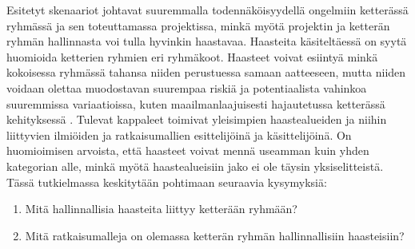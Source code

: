 Esitetyt skenaariot johtavat suuremmalla todennäköisyydellä ongelmiin ketterässä ryhmässä ja sen toteuttamassa projektissa, minkä myötä projektin ja ketterän ryhmän hallinnasta voi tulla hyvinkin haastavaa. Haasteita käsiteltäessä on syytä huomioida ketterien ryhmien eri ryhmäkoot. Haasteet voivat esiintyä minkä kokoisessa ryhmässä tahansa niiden perustuessa samaan aatteeseen, mutta niiden voidaan olettaa muodostavan suurempaa riskiä ja potentiaalista vahinkoa suuremmissa variaatioissa, kuten maailmanlaajuisesti hajautetussa ketterässä kehityksessä \cite{ALZOUBI201622}. Tulevat kappaleet toimivat yleisimpien haastealueiden ja niihin liittyvien ilmiöiden ja ratkaisumallien esittelijöinä ja käsittelijöinä. On huomioimisen arvoista, että haasteet voivat mennä useamman kuin yhden kategorian alle, minkä myötä haastealueisiin jako ei ole täysin yksiselitteistä. Tässä tutkielmassa keskitytään pohtimaan seuraavia kysymyksiä: \begin{enumerate}
    \item Mitä hallinnallisia haasteita liittyy ketterään ryhmään?
    \item Mitä ratkaisumalleja on olemassa ketterän ryhmän hallinnallisiin haasteisiin?
\end{enumerate}
